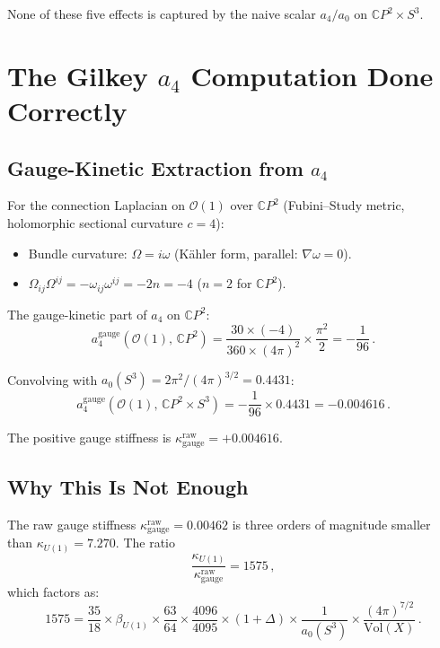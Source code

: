 \documentclass[12pt,a4paper]{article}
\theoremstyle{definition}
\begin{document}
None of these five effects is captured by the naive scalar $a_4/a_0$ on
$\mathbb{C}P^2 \times S^3$.

\section{The Gilkey $a_4$ Computation Done Correctly}
\label{sec:correct-a4}

\subsection{Gauge-Kinetic Extraction from $a_4$}

For the connection Laplacian on $\mathcal{O}(1)$ over $\mathbb{C}P^2$
(Fubini--Study metric, holomorphic sectional curvature $c = 4$):

\begin{itemize}
\item Bundle curvature: $\Omega = i\omega$ (K\"ahler form, parallel:
  $\nabla\omega = 0$).
\item $\Omega_{ij}\Omega^{ij} = -\omega_{ij}\omega^{ij} = -2n = -4$
  \quad ($n = 2$ for $\mathbb{C}P^2$).
\end{itemize}

The gauge-kinetic part of $a_4$ on $\mathbb{C}P^2$:
\begin{equation}\label{eq:a4-gauge}
a_4^{\mathrm{gauge}}(\mathcal{O}(1),\,\mathbb{C}P^2)
= \frac{30 \times (-4)}{360 \times (4\pi)^2} \times \frac{\pi^2}{2}
= -\frac{1}{96}\,.
\end{equation}

Convolving with $a_0(S^3) = 2\pi^2/(4\pi)^{3/2} = 0.4431$:
\begin{equation}
a_4^{\mathrm{gauge}}(\mathcal{O}(1),\,\mathbb{C}P^2 \times S^3)
= -\frac{1}{96} \times 0.4431 = -0.004616\,.
\end{equation}

The positive gauge stiffness is $\kappa_{\mathrm{gauge}}^{\mathrm{raw}}
= +0.004616$.

\subsection{Why This Is Not Enough}

The raw gauge stiffness $\kappa_{\mathrm{gauge}}^{\mathrm{raw}} = 0.00462$
is three orders of magnitude smaller than
$\kappa_{U(1)} = 7.270$.  The ratio
\begin{equation}
\frac{\kappa_{U(1)}}{\kappa_{\mathrm{gauge}}^{\mathrm{raw}}} = 1575\,,
\end{equation}
which factors as:
\begin{equation}
1575 = \frac{35}{18} \times \beta_{U(1)} \times
\frac{63}{64} \times \frac{4096}{4095} \times (1+\Delta)
\times \frac{1}{a_0(S^3)}
\times \frac{(4\pi)^{7/2}}{\mathrm{Vol}(X)}\,.
\end{equation}
\end{document}
